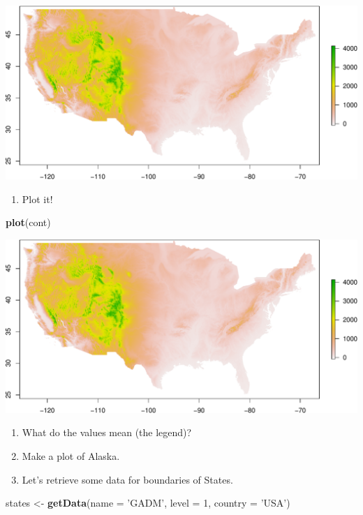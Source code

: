 \documentclass[
]{book}
\newenvironment{Shaded}{\begin{snugshade}}{\end{snugshade}}
\newcommand{\DataTypeTok}[1]{\textcolor[rgb]{0.13,0.29,0.53}{#1}}
\newcommand{\DecValTok}[1]{\textcolor[rgb]{0.00,0.00,0.81}{#1}}
\newcommand{\KeywordTok}[1]{\textcolor[rgb]{0.13,0.29,0.53}{\textbf{#1}}}
\newcommand{\NormalTok}[1]{#1}
\newcommand{\StringTok}[1]{\textcolor[rgb]{0.31,0.60,0.02}{#1}}
\providecommand{\tightlist}{%
  \setlength{\itemsep}{0pt}\setlength{\parskip}{0pt}}
\begin{document}
\includegraphics{figures/unnamed-chunk-415-1.pdf}

\begin{enumerate}
\def\labelenumi{\arabic{enumi}.}
\setcounter{enumi}{6}
\tightlist
\item
  Plot it!
\end{enumerate}

\begin{Shaded}
\begin{Highlighting}[]
\KeywordTok{plot}\NormalTok{(cont)}
\end{Highlighting}
\end{Shaded}

\includegraphics{figures/unnamed-chunk-416-1.pdf}

\begin{enumerate}
\def\labelenumi{\arabic{enumi}.}
\setcounter{enumi}{7}
\item
  What do the values mean (the legend)?
\item
  Make a plot of Alaska.
\item
  Let's retrieve some data for boundaries of States.
\end{enumerate}

\begin{Shaded}
\begin{Highlighting}[]
\NormalTok{states <-}\StringTok{ }\KeywordTok{getData}\NormalTok{(}\DataTypeTok{name =} \StringTok{'GADM'}\NormalTok{, }\DataTypeTok{level =} \DecValTok{1}\NormalTok{, }\DataTypeTok{country =} \StringTok{'USA'}\NormalTok{)}
\end{Highlighting}
\end{Shaded}
\end{document}
